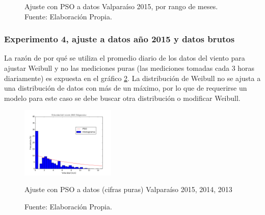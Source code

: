 \begin{figure}[ht!]
{    }%
    \caption{Ajuste con PSO a datos Valparaíso 2015, por rango de meses.\\ Fuente: Elaboración Propia.}
    \label{fig:subfigures}
\end{figure}

\subsubsection{Experimento 4, ajuste a datos año 2015 y datos brutos}
La razón de por qué se utiliza el promedio diario de los datos del viento para ajustar Weibull y no las mediciones puras (las mediciones tomadas cada 3 horas diariamente) es expuesta en el gráfico \ref{fig:pso_valpo_15_all_data}. La distribución de Weibull no se ajusta a una distribución de datos con más de un máximo, por lo que de requerirse un modelo para este caso se debe buscar otra distribución o modificar Weibull.

\begin{figure}[ht!]
    \centering
    \includegraphics[width=0.4\textwidth]{figures/result_2015_all_data.png}
    \caption{Ajuste con PSO a datos (cifras puras) Valparaíso 2015, 2014, 2013}
    \vspace{-.25cm}
    \caption*{Fuente: Elaboración Propia.}
    \label{fig:pso_valpo_15_all_data}
\end{figure}

